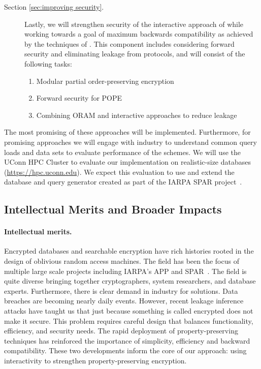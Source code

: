 \begin{description}
\item[Section \ref{sec:improving security}.] Lastly, we will strengthen
security of the interactive approach of 
while working towards a goal of maximum
backwards compatibility as achieved by the techniques of .
This component includes considering forward
security and eliminating leakage from protocols, and will
consist of the following tasks:
\begin{enumerate}\setlength\itemsep{0em}
\item Modular partial order-preserving encryption
\item Forward security for POPE
\item Combining ORAM and interactive approaches to reduce leakage
\end{enumerate}
\end{description}
The most promising of these approaches will be implemented.
Furthermore, for promising approaches we will engage with industry to
understand common query loads and data sets to evaluate performance of
the schemes.  We will use the UConn HPC Cluster to evaluate our
implementation on realistic-size databases (\url{https://hpc.uconn.edu}).
We expect this evaluation
to use and extend the database and query generator created as part of
the IARPA SPAR project~\cite{varia2015automated}.

\subsection{Intellectual Merits and Broader Impacts}
\paragraph{Intellectual merits.}  
Encrypted databases and searchable encryption have rich histories rooted in the
design of oblivious random access machines.  The field has been the focus of multiple large scale projects including IARPA's APP and SPAR~\cite{spar_baa}.  The field is quite diverse bringing together cryptographers, system researchers, and database experts.  Furthermore, there is clear demand in industry for solutions.  Data breaches are becoming nearly daily events.  However, recent
leakage inference attacks have taught us that just because something is called encrypted does not make it secure.  This problem requires careful design that balances functionality, efficiency, and security needs.  The rapid deployment of property-preserving
techniques has reinforced the importance of simplicity, efficiency and backward
compatibility.  These two developments inform the core of our approach: using
interactivity to strengthen property-preserving encryption.

